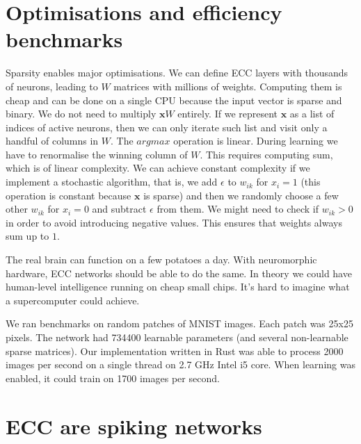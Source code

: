 \documentclass[12pt]{article}
\begin{document}
\section{Optimisations and efficiency benchmarks}

Sparsity enables major optimisations. We can define ECC layers with thousands of neurons, leading to $W$ matrices with millions of weights. Computing them is cheap and can be done on a single CPU because the input vector is sparse and binary. We do not need to multiply $\boldsymbol{x}W$ entirely. If we represent $\boldsymbol{x}$ as a list of indices of active neurons, then we can only iterate such list and visit only a handful of columns in $W$. The $argmax$ operation is linear. During learning we have to renormalise the winning column of $W$. This requires computing sum, which is of linear complexity. We can achieve constant complexity if we implement a stochastic algorithm, that is, we add $\epsilon$ to $w_{ik}$ for $x_i=1$ (this operation is constant because $\boldsymbol{x}$ is sparse) and then we randomly choose a few other $w_{ik}$ for $x_i=0$ and subtract $\epsilon$ from them. We might need to check if $w_{ik}>0$ in order to avoid introducing negative values. This ensures that weights always sum up to $1$.

The real brain can function on a few potatoes a day. With neuromorphic hardware, ECC networks should be able to do the same. In theory we could have human-level intelligence running on cheap small chips. It's hard to imagine what a supercomputer could achieve.

We ran benchmarks on random patches of MNIST images. Each patch was 25x25 pixels. The network had 734400 learnable parameters (and several non-learnable sparse matrices). Our implementation written in Rust was able to process 2000 images per second on a single thread on 2.7 GHz Intel i5 core. When learning was enabled, it could train on 1700 images per second.


\section{ECC are spiking networks}
\end{document}
